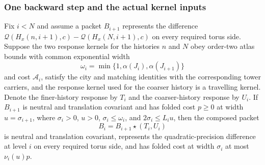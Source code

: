 \subsubsection{One backward step and the actual kernel inputs}

\begin{lemma}
\label{lem:ex-lattice-rg-one-step}
Fix $i<N$ and assume a packet $B_{i+1}$ represents the difference
$\mathscr Q(H_x(n,i+1),c)-\mathscr Q(H_x(N,i+1),c)$ on every required torus side. Suppose
the two response kernels for the histories $n$ and $N$ obey order-two atlas
bounds with common exponential width
\[
 \omega_i=\min\{1,\alpha(J_i),\alpha(J_{i+1})\}
\]
and cost $\mathcal A_i$, satisfy the city and matching identities with
the corresponding tower carriers, and the response kernel used for the
coarser history is a travelling kernel. Denote the finer-history response
by $T_i$ and the coarser-history response by $U_i$. If $B_{i+1}$ is neutral and
translation covariant and has folded cost $p\geq0$ at width
$u=\sigma_{i+1}$, where $\sigma_i>0$, $u>0$, $\sigma_i\leq\omega_i$, and $2\sigma_i\leq L_i u$, then the composed packet
\[
 B_i=B_{i+1}\star(T_i,U_i)
\]
is neutral and translation covariant, represents the quadratic-precision
difference at level $i$ on every required torus side, and has folded cost
at width $\sigma_i$ at most $\nu_i(u)p$.
\end{lemma}

